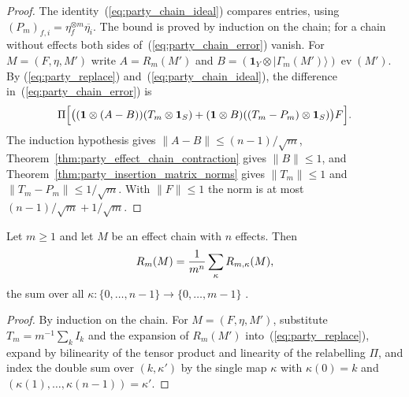 \begin{proof}\leanok
    The identity~(\ref{eq:party_chain_ideal}) compares entries, using
    $(P_m)_{f,i}=\eta^{\otimes m}_f\overline{\eta_i}$. The bound is proved
    by induction on the chain; for a chain without effects both sides
    of~(\ref{eq:party_chain_error}) vanish. For $M=(F,\eta,M')$ write
    $A=R_m(M')$ and
    $B=(\mathbf 1_Y\otimes|\Gamma_m(M')\rangle)\operatorname{ev}(M')$. By
    (\ref{eq:party_replace}) and~(\ref{eq:party_chain_ideal}), the
    difference in~(\ref{eq:party_chain_error}) is
    \begin{align}
        \Pi\Bigl[\bigl((\mathbf 1\otimes(A-B))(T_m\otimes\mathbf 1_S)
               +(\mathbf 1\otimes B)((T_m-P_m)\otimes\mathbf 1_S)\bigr)F\Bigr].
        \notag
    \end{align}
    The induction hypothesis gives $\lVert A-B\rVert\le(n-1)/\sqrt m$,
    Theorem~\ref{thm:party_effect_chain_contraction} gives
    $\lVert B\rVert\le1$, and Theorem~\ref{thm:party_insertion_matrix_norms}
    gives $\lVert T_m\rVert\le1$ and
    $\lVert T_m-P_m\rVert\le1/\sqrt m$. With $\lVert F\rVert\le1$ the norm
    is at most $(n-1)/\sqrt m+1/\sqrt m$.
\end{proof}

\begin{theorem}
    \label{thm:party_effect_chain_expansion}
    \leanok
    Let $m\ge1$ and let $M$ be an effect chain with $n$ effects. Then
    \begin{align}
        R_m(M)=\frac1{m^n}\sum_{\kappa}R_{m,\kappa}(M),
        \notag
    \end{align}
    the sum over all $\kappa:\{0,\dots,n-1\}\to\{0,\dots,m-1\}$
    \cite[proof of Lemma~5.1]{OpenAI2026PolynomialPEPS}.
\end{theorem}

\begin{proof}\leanok
    By induction on the chain. For $M=(F,\eta,M')$, substitute
    $T_m=m^{-1}\sum_kI_k$ and the expansion of $R_m(M')$
    into~(\ref{eq:party_replace}), expand by bilinearity of the tensor
    product and linearity of the relabelling $\Pi$, and index the double
    sum over $(k,\kappa')$ by the single map $\kappa$ with $\kappa(0)=k$
    and $(\kappa(1),\dots,\kappa(n-1))=\kappa'$.
\end{proof}

